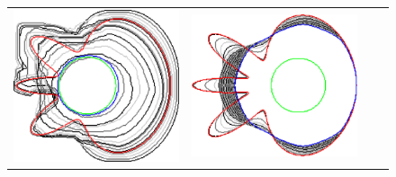 \begin{figure}
\begin{tabular}{cccc}
\includegraphics[scale=0.2]{figures/chapter9/free-elastica/localsearch/flower/len_pen-0.01/radius-7/summary.pdf} & 
\includegraphics[scale=0.2]{figures/chapter9/free-elastica/flipflow/flower/len_pen-0.01/radius-7/summary.pdf} &

\end{tabular}
\end{figure}
